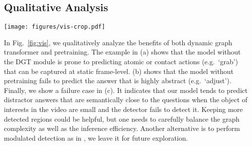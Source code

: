 \documentclass[runningheads]{llncs}
\newcommand{\eg}{e.g.}
\begin{document}
\setlength{\tabcolsep}{1pt}
\begin{table*}[t!]
    \small
    \centering
    \caption{Study of cross-model pretraining. Results on NExT-QA are with 20 regions.
    }
    \label{tab:pt}
    \vspace{-0.2cm}
    \vspace{-0.5cm}
\end{table*}



\subsection{Qualitative Analysis}
\begin{figure*}[t!]
  \begin{center}
    \texttt{[image: figures/vis-crop.pdf]}
  \end{center}
  \vspace{-0.7cm}
  \caption{Result visualization on NExT-QA \cite{xiao2021next}. The ground-truth answers are in green. 
}
  \label{fig:vis}
  \vspace{-0.5cm}
\end{figure*}
In Fig.~\ref{fig:vis}, we qualitatively analyze the benefits of both dynamic graph transformer and pretraining. The example in (a) shows that the model without the DGT module is prone to predicting atomic or contact actions (\eg~`grab') that can be captured at static frame-level. (b) shows that the model without pretraining fails to predict the answer that is highly abstract (\eg~`adjust'). Finally, we show a failure case in (c). It indicates that our model tends to predict distractor answers that are semantically close to the questions when the object of interests in the video are small and the detector fails to detect it. Keeping more detected regions could be helpful, but one needs to carefully balance the graph complexity as well as the inference efficiency. Another alternative is to perform modulated detection as in \cite{kamath2021mdetr}, we leave it for future exploration.
\end{document}
